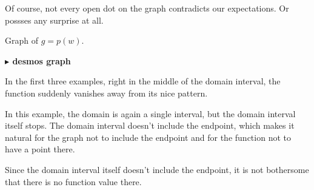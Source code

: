 \documentclass{ximera}
\begin{document}
Of course, not every open dot on the graph contradicts our expectations. Or possses any surprise at all.






Graph of $g = p(w)$.

\begin{image}
\end{image}






\begin{onlineOnly}
\textbf{\textcolor{blue!55!black}{$\blacktriangleright$ desmos graph}} 
\begin{center}
\end{center}
\end{onlineOnly}





In the first three examples, right in the middle of the domain interval, the function suddenly vanishes away from its nice pattern. 

In this example, the domain is again a single interval, but the domain interval itself stops. The domain interval doesn’t include the endpoint, which makes it natural for the graph not to include the endpoint and for the function not to have a point there.

Since the domain interval itself doesn't include the endpoint, it is not bothersome that there is no function value there.
\end{document}
